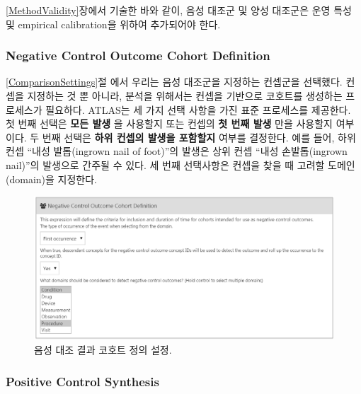 \documentclass[11pt]{book}
\theoremstyle{definition}
\theoremstyle{definition}
\theoremstyle{definition}
\theoremstyle{remark}
\begin{document}
\ref{MethodValidity}장에서 기술한 바와 같이, 음성 대조군 및 양성
대조군은 운영 특성 및 empirical calibration을 위하여 추가되어야 한다.

\subsubsection*{Negative Control Outcome Cohort
Definition}\label{negative-control-outcome-cohort-definition}

\ref{ComparisonSettings}절 에서 우리는 음성 대조군을 지정하는 컨셉군을
선택했다. 컨셉을 지정하는 것 뿐 아니라, 분석을 위해서는 컨셉을 기반으로
코호트를 생성하는 프로세스가 필요하다. ATLAS는 세 가지 선택 사항을 가진
표준 프로세스를 제공한다. 첫 번째 선택은 \textbf{모든 발생} 을 사용할지
또는 컨셉의 \textbf{첫 번째 발생} 만을 사용할지 여부이다. 두 번째 선택은
\textbf{하위 컨셉의 발생을 포함할지} 여부를 결정한다. 예를 들어, 하위
컨셉 ``내성 발톱(ingrown nail of foot)''의 발생은 상위 컨셉 ``내성
손발톱(ingrown nail)''의 발생으로 간주될 수 있다. 세 번째 선택사항은
컨셉을 찾을 때 고려할 도메인(domain)을 지정한다.

\begin{figure}

{\centering \includegraphics[width=1\linewidth]{images/PopulationLevelEstimation/ncSettings} 

}

\caption{음성 대조 결과 코호트 정의 설정.}\label{fig:ncSettings}
\end{figure}

\subsubsection*{Positive Control
Synthesis}\label{positive-control-synthesis}
\end{document}
